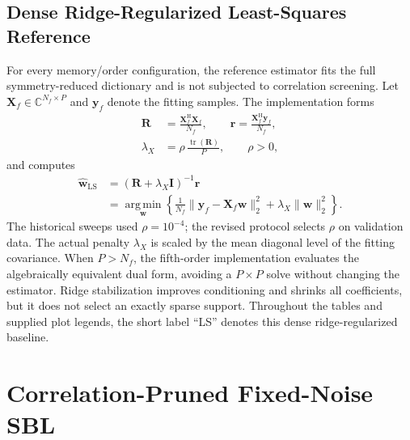 \documentclass[conference]{IEEEtran}
\newcommand{\mat}[1]{\mathbf{#1}}
\newcommand{\herm}{\mathrm{H}}
\newcommand{\argmin}{\operatorname*{arg\,min}}
\begin{document}
\subsection{Dense Ridge-Regularized Least-Squares Reference}
For every memory/order configuration, the reference estimator fits the full symmetry-reduced dictionary and is not subjected to correlation screening.
Let $\mat X_f\in\mathbb C^{N_f\times P}$ and $\mat y_f$ denote the fitting samples. The implementation forms
\begin{align}
 \mat R&=\frac{\mat X_f^{\herm}\mat X_f}{N_f},\qquad
 \mat r=\frac{\mat X_f^{\herm}\mat y_f}{N_f}, \label{eq:ls-stats}\\
 \lambda_X&=\rho\,\frac{\operatorname{tr}(\mat R)}{P},\qquad
 \rho>0, \label{eq:ls-lambda}
\end{align}
and computes
\begin{equation}
\begin{split}
 \widehat{\mat w}_{\mathrm{LS}}
 &=\left(\mat R+\lambda_X\mat I\right)^{-1}\mat r\\
 &=\argmin_{\mat w}\left\{
 \frac{1}{N_f}\|\mat y_f-\mat X_f\mat w\|_2^2
 +\lambda_X\|\mat w\|_2^2\right\}.
\end{split}
\label{eq:ls}
\end{equation}
The historical sweeps used $\rho=10^{-4}$; the revised protocol selects $\rho$ on validation data. The actual penalty $\lambda_X$ is scaled by the mean diagonal level of the fitting covariance. %
When $P>N_f$, the fifth-order implementation evaluates the algebraically equivalent dual form, avoiding a $P\times P$ solve without changing the estimator.
Ridge stabilization improves conditioning and shrinks all coefficients, but it does not select an exactly sparse support. Throughout the tables and supplied plot legends, the short label ``LS'' denotes this dense ridge-regularized baseline.

\section{Correlation-Pruned Fixed-Noise SBL}
\label{sec:method}
\end{document}
